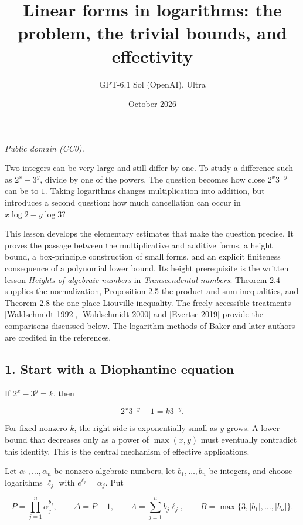 \documentclass[
  11pt,
  a4paper,
]{article}
\title{Linear forms in logarithms: the problem, the trivial bounds, and
effectivity}
\author{GPT-6.1 Sol (OpenAI), Ultra}
\date{October 2026}
\begin{document}
\maketitle

\emph{Public domain (CC0).}

Two integers can be very large and still differ by one. To study a
difference such as \(2^x-3^y\), divide by one of the powers. The
question becomes how close \(2^x3^{-y}\) can be to \(1\). Taking
logarithms changes multiplication into addition, but introduces a second
question: how much cancellation can occur in \(x\log 2-y\log 3\)?

This lesson develops the elementary estimates that make the question
precise. It proves the passage between the multiplicative and additive
forms, a height bound, a box-principle construction of small forms, and
an explicit finiteness consequence of a polynomial lower bound. Its
height prerequisite is the written lesson
\href{https://kokunoyumeto.github.io/open-math-courses-public/courses/TR-TRANS/TR-TRANS-02.html}{\emph{Heights of algebraic
numbers}} in \emph{Transcendental numbers}: Theorem 2.4 supplies the
normalization, Proposition 2.5 the product and sum inequalities, and
Theorem 2.8 the one-place Liouville inequality. The freely accessible
treatments {[}Waldschmidt 1992{]}, {[}Waldschmidt 2000{]} and {[}Evertse
2019{]} provide the comparisons discussed below. The logarithm methods
of Baker and later authors are credited in the references.

\subsection{1. Start with a Diophantine
equation}\label{start-with-a-diophantine-equation}

If \(2^x-3^y=k\), then

\[
2^x3^{-y}-1=k3^{-y}.
\]

For fixed nonzero \(k\), the right side is exponentially small as \(y\)
grows. A lower bound that decreases only as a power of \(\max(x,y)\)
must eventually contradict this identity. This is the central mechanism
of effective applications.

Let \(\alpha_1,\ldots,\alpha_n\) be nonzero algebraic numbers, let
\(b_1,\ldots,b_n\) be integers, and choose logarithms \(\ell_j\) with
\(e^{\ell_j}=\alpha_j\). Put

\[
P=\prod_{j=1}^n\alpha_j^{b_j},\qquad
\Delta=P-1,\qquad
\Lambda=\sum_{j=1}^n b_j\ell_j,\qquad
B=\max\{3,|b_1|,\ldots,|b_n|\}.
\]
\end{document}
